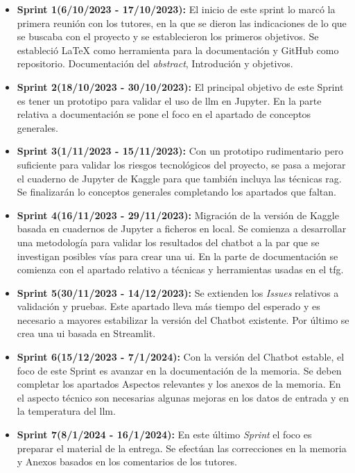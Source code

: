 \begin{itemize}
    \item \textbf{Sprint 1(6/10/2023 - 17/10/2023):} El inicio de este sprint lo marcó la primera reunión con los tutores, en la que se dieron las indicaciones de lo que se buscaba con el proyecto y se establecieron los primeros objetivos. Se estableció LaTeX como herramienta para la documentación y GitHub como repositorio.
    Documentación del \textit{abstract}, Introdución y objetivos.

    \item \textbf{Sprint 2(18/10/2023 - 30/10/2023):} El principal objetivo de este Sprint es tener un prototipo para validar el uso de \acrshort{llm} en Jupyter. En la parte relativa a documentación se pone el foco en el apartado de conceptos generales.

    \item \textbf{Sprint 3(1/11/2023 - 15/11/2023):} Con un prototipo rudimentario pero suficiente para validar los riesgos tecnológicos del proyecto, se pasa a mejorar el cuaderno de Jupyter de Kaggle para que también incluya las técnicas \acrshort{rag}. Se finalizarán lo conceptos generales completando los apartados que faltan.

    \item \textbf{Sprint 4(16/11/2023 - 29/11/2023):} Migración de la versión de Kaggle  basada en cuadernos de Jupyter a ficheros en local. Se comienza a desarrollar una metodología para validar los resultados del chatbot a la par que se investigan posibles vías para crear una \acrshort{ui}. En la parte de documentación se comienza con el apartado relativo a técnicas y herramientas usadas en el \acrshort{tfg}.

    \item \textbf{Sprint 5(30/11/2023 - 14/12/2023):} Se extienden los \textit{Issues} relativos a validación y pruebas. Este apartado lleva más tiempo del esperado y es necesario a mayores estabilizar la versión del Chatbot existente. Por último se crea una \acrshort{ui} basada en Streamlit.

    \item \textbf{Sprint 6(15/12/2023 - 7/1/2024):} Con la versión del Chatbot estable, el foco de este Sprint es avanzar en la documentación de la memoria. Se deben completar los apartados Aspectos relevantes y los anexos de la memoria. En el aspecto técnico son necesarias algunas mejoras en los datos de entrada y en la temperatura del \acrshort{llm}. 

    \item \textbf{Sprint 7(8/1/2024 - 16/1/2024):} En este último \textit{Sprint} el foco es preparar el material de la entrega. Se efectúan las correcciones en la memoria y Anexos basados en los comentarios de los tutores.
\end{itemize}

